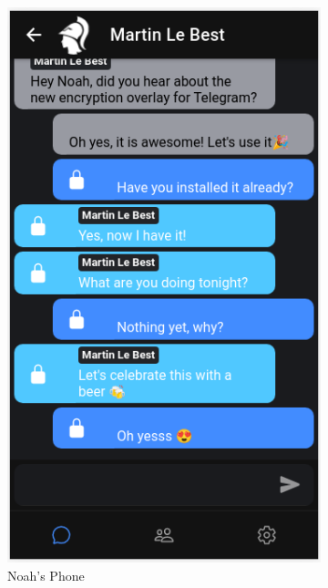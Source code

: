 \documentclass[a4paper, oneside]{discothesis}
\begin{document}
\begin{figure}[h]
\begin{subfigure}{.5\textwidth}
  \includegraphics[width=.8\linewidth]{figures/chat_noah.png}
  \caption{Noah's Phone}
  \label{fig:chat_noah}
\end{subfigure}
\begin{subfigure}{.5\textwidth}
  \centering

\end{subfigure}
\end{figure}
\end{document}
